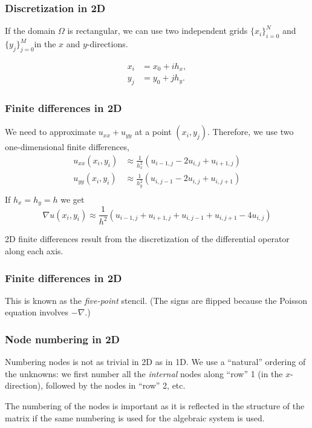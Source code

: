 \begin{frame}
  \frametitle{Discretization in 2D}
  If the domain $\Omega$ is rectangular, we can use two independent grids
  $\{x_i\}_{i=0}^N$ and $\{y_j\}_{j=0}^M$in the $x$ and $y$-directions.
  \begin{center}
    \scalebox{0.7}{}
  \end{center}
  \begin{align*}
    x_i &= x_0 + ih_x, \\
    y_j &= y_0 + jh_y.
  \end{align*}
\end{frame}

\begin{frame}
  \frametitle{Finite differences in 2D}
  We need to approximate $u_{xx} + u_{yy}$ at a point $(x_i, y_j)$. Therefore,
  we use two one-dimensional finite differences,
  \begin{align*}
    u_{xx}(x_i, y_i) &\approx \frac{1}{h_x^2}
                       \left( u_{i-1,j} - 2u_{i,j} + u_{i+1,j} \right) \\
    u_{yy}(x_i, y_i) &\approx \frac{1}{h_y^2}
                       \left( u_{i,j-1} - 2u_{i,j} + u_{i,j+1} \right) \\
  \end{align*}
  If $h_x = h_y = h$ we get
  \[
    \nabla u(x_i, y_i) \approx \frac{1}{h^2}
    \left( u_{i-1,j} + u_{i+1,j} + u_{i,j-1} + u_{i,j+1} - 4u_{i,j} \right)
  \]

\medskip 2D finite differences result from the discretization of the differential operator along each axis.
\end{frame}

\begin{frame}
  \frametitle{Finite differences in 2D}
  This is known as the \emph{five-point} stencil. (The signs are flipped because
  the Poisson equation involves $-\nabla$.)
  \begin{center}
    
  \end{center}
\end{frame}

\begin{frame}
  \frametitle{Node numbering in 2D}
  Numbering nodes is not as trivial in 2D as in 1D. We use a ``natural''
  ordering of the unknowns: we first number all the \emph{internal} nodes along
  ``row'' 1 (in the $x$-direction), followed by the nodes in ``row'' 2, etc.
  \begin{center}
    
  \end{center}

\medskip The numbering of the nodes is important as it is reflected in the structure of the matrix if the same numbering is used for the algebraic system is used.
\end{frame}

